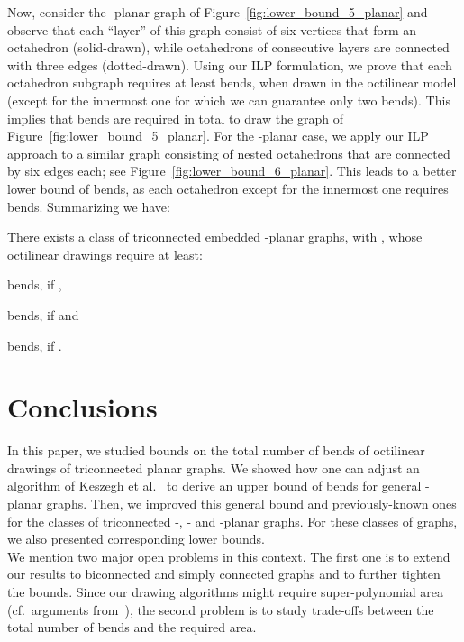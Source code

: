 \documentclass[a4paper,twoside,11pt]{article}
\begin{document}
Now, consider the -planar graph of
Figure~\ref{fig:lower_bound_5_planar} and observe that each ``layer''
of this graph consist of six vertices that form an octahedron
(solid-drawn), while octahedrons of consecutive layers are connected
with three edges (dotted-drawn). Using our ILP formulation, we prove
that each octahedron subgraph requires at least  bends, when drawn
in the octilinear model (except for the innermost one for which we
can guarantee only two bends). This implies that  bends are
required in total to draw the graph of
Figure~\ref{fig:lower_bound_5_planar}. For the -planar case, we
apply our ILP approach to a similar graph consisting of nested
octahedrons that are connected by six edges each; see
Figure~\ref{fig:lower_bound_6_planar}. This leads to a better lower
bound of  bends, as each octahedron except for the innermost
one requires  bends. Summarizing we have:

\begin{theorem}
There exists a class  of triconnected embedded -planar
graphs, with , whose octilinear drawings
require at least:
\begin{inparaenum}[(i)]
  \item  bends, if ,
  \item  bends, if  and
  \item  bends, if .
\end{inparaenum}
\label{thm:lb}
\end{theorem}



\section{Conclusions}
\label{sec:conclusions}


In this paper, we studied bounds on the total number of bends of octilinear
drawings of triconnected planar graphs. We showed how one can adjust an
algorithm of Keszegh et al.~\cite{KPP13} to derive an upper bound of 
bends for general -planar graphs.
Then, we improved this general bound and previously-known ones for the classes
of triconnected -, - and -planar graphs. For these classes of graphs,
we also presented corresponding lower bounds.\\
We mention two major open problems in this context. The first one is to extend
our results to biconnected and simply connected graphs and to further tighten
the bounds. Since our drawing algorithms might require super-polynomial area
(cf.~arguments from~\cite{BGKK14}), the second problem is to study trade-offs
between the total number of bends and the required area.





\end{document}
